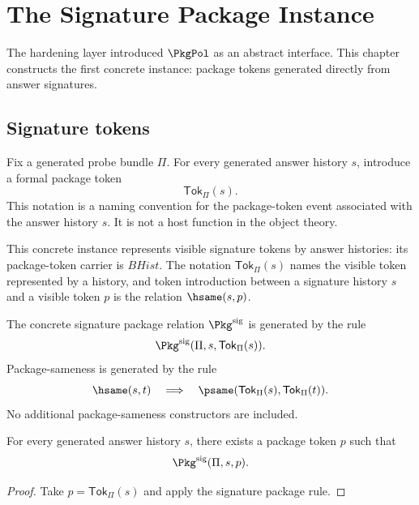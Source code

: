 \chapter{The Signature Package Instance}
\label{ch:concrete-instances-signature-package}

The hardening layer introduced \(\PkgPol\) as an abstract interface. This chapter constructs the first concrete instance: package tokens generated directly from answer signatures.

\section{Signature tokens}

\begin{definition}
\label{def:signature-token-generator}
Fix a generated probe bundle \(\Pi\). For every generated answer history \(s\), introduce a formal package token
$$
  \mathsf{Tok}_{\Pi}(s).
$$
This notation is a naming convention for the package-token event associated with the answer history \(s\). It is not a host function in the object theory.
\end{definition}

\begin{definition}
This concrete instance represents visible signature tokens by answer histories: its package-token carrier is $BHist$. The notation $\mathsf{Tok}_{\Pi}(s)$ names the visible token represented by a history, and token introduction between a signature history $s$ and a visible token $p$ is the relation $\hsame(s,p)$.

The concrete signature package relation $\Pkg^{\mathrm{sig}}$ is generated by the rule
$$
  \Pkg^{\mathrm{sig}}(\Pi,s,\mathsf{Tok}_{\Pi}(s)).
$$
Package-sameness is generated by the rule
$$
  \hsame(s,t)\quad\Longrightarrow\quad
  \psame(\mathsf{Tok}_{\Pi}(s),\mathsf{Tok}_{\Pi}(t)).
$$
No additional package-sameness constructors are included.
\end{definition}

\begin{lemma}
\label{lem:signature-package-existence}
For every generated answer history \(s\), there exists a package token \(p\) such that
$$
  \Pkg^{\mathrm{sig}}(\Pi,s,p).
$$
\end{lemma}
\begin{proof}
Take \(p=\mathsf{Tok}_{\Pi}(s)\) and apply the signature package rule.
\end{proof}

